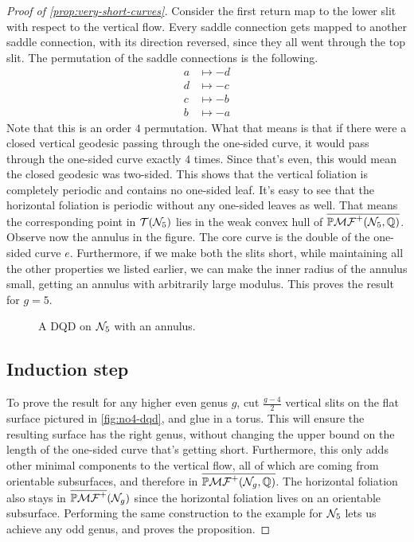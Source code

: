 \documentclass[12pt, reqno]{amsart}
\begin{document}
\begin{proof}[Proof of \autoref{prop:very-short-curves}]
Consider the first return map to the lower slit with respect to the vertical flow.
Every saddle connection gets mapped to another saddle connection, with its direction reversed, since they all went through the top slit.
The permutation of the saddle connections is the following.
\begin{align*}
  a &\mapsto -d \\
  d &\mapsto -c \\
  c &\mapsto -b \\
  b &\mapsto -a
\end{align*}
Note that this is an order $4$ permutation.
What that means is that if there were a closed vertical geodesic passing through the one-sided curve, it would pass through the one-sided curve exactly $4$ times.
Since that's even, this would mean the closed geodesic was two-sided.
This shows that the vertical foliation is completely periodic and contains no one-sided leaf. It's easy to see that the horizontal foliation is periodic without any one-sided leaves as well.
That means the corresponding point in $\mathcal{T}(\mathcal{N}_5)$ lies in the weak convex hull of
$\overline{\mathbb{P}\mathcal{MF}^+(\mathcal{N}_5, \mathbb{Q})}$.
Observe now the annulus in the figure.
The core curve is the double of the one-sided curve $e$.
Furthermore, if we make both the slits short, while maintaining all the other properties we listed earlier, we can make the inner radius of the annulus small, getting an annulus with arbitrarily large modulus.
This proves the result for $g=5$.
\begin{figure}[h]
  \centering
  \caption{A DQD on $\mathcal{N}_5$ with an annulus.}
  \label{fig:no5-dqd}
\end{figure}

\subsection*{Induction step}
To prove the result for any higher even genus $g$, cut $\frac{g-4}{2}$ vertical slits on the flat surface pictured in \autoref{fig:no4-dqd}, and glue in a torus.
This will ensure the resulting surface has the right genus, without changing the upper bound on the length of the one-sided curve that's getting short.
Furthermore, this only adds other minimal components to the vertical flow, all of which are coming from orientable subsurfaces, and therefore in $\overline{\mathbb{P}\mathcal{MF}^+(\mathcal{N}_g, \mathbb{Q})}$.
The horizontal foliation also stays in $\overline{\mathbb{P}\mathcal{MF}^+}(\mathcal{N}_g)$ since the horizontal foliation lives on an orientable subsurface.
Performing the same construction to the example for $\mathcal{N}_5$ lets us achieve any odd genus, and proves the proposition.
\end{proof}
\end{document}
